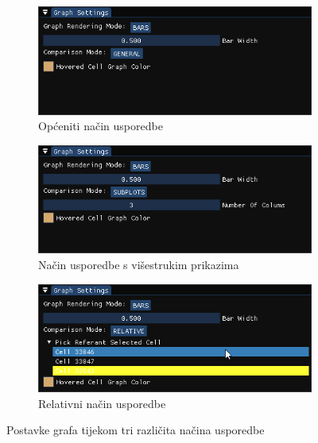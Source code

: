 \documentclass[times, utf8, diplomski]{fer}
\begin{document}
\begin{figure} [H]
     \centering
     \begin{subfigure}[h]{0.495\textwidth}
         \centering
         \includegraphics[width=\textwidth]{graph_settings_default.png}
         \caption{Općeniti način usporedbe}
         \label{fig:graph-settings-normal-mode}
     \end{subfigure}
     \hfill
     \begin{subfigure}[h]{0.495\textwidth}
         \centering
         \includegraphics[width=\textwidth]{graph_settings_subplots.png}
         \caption{Način usporedbe s višestrukim prikazima}
         \label{fig:graph-settings-limits-mode}
     \end{subfigure}
     \hfill
     \begin{subfigure}[h]{0.495\textwidth}
         \centering
         \includegraphics[width=\textwidth]{graph_settings_relative.png}
         \caption{Relativni način usporedbe}
         \label{fig:graph-settings-limits-mode}
     \end{subfigure}
     \caption{Postavke grafa tijekom tri različita načina usporedbe}
     \label{fig:graph-settings-3-modes}
\end{figure}
\end{document}
